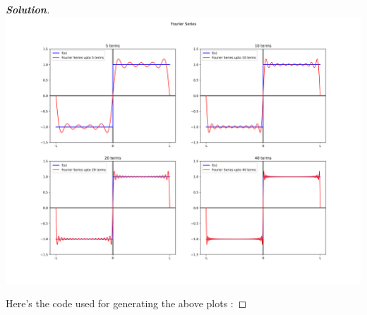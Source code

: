 \documentclass[10pt]{scrartcl}
\theoremstyle{definition}
\newenvironment{solution} {\begin{proof}[\normalfont \textbf{Solution}]} {\end{proof}}
\begin{document}
\begin{solution}
    \includegraphics[width = 6.0in]{fourier_series_2.png}

    Here's the code used for generating the above plots :

    
\end{solution}
\end{document}
